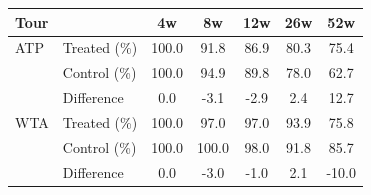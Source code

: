\begin{tabular}{ll*{5}{c}}
\toprule
Tour & & 4w & 8w & 12w & 26w & 52w \\
\midrule
ATP & Treated (\%) & 100.0 & 91.8 & 86.9 & 80.3 & 75.4 \\
 & Control (\%) & 100.0 & 94.9 & 89.8 & 78.0 & 62.7 \\
 & Difference & 0.0 & -3.1 & -2.9 & 2.4 & 12.7 \\[0.3em]
WTA & Treated (\%) & 100.0 & 97.0 & 97.0 & 93.9 & 75.8 \\
 & Control (\%) & 100.0 & 100.0 & 98.0 & 91.8 & 85.7 \\
 & Difference & 0.0 & -3.0 & -1.0 & 2.1 & -10.0 \\[0.3em]
\bottomrule
\end{tabular}
